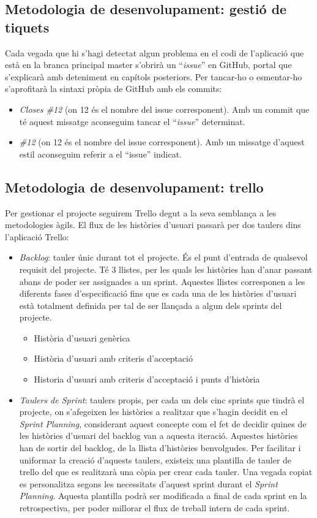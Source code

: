 \subsection{Metodologia de desenvolupament: gestió de tiquets}
Cada vegada que hi s'hagi detectat algun problema en el codi de l'aplicació que està en la branca principal master s'obrirà un “\textit{issue}” en GitHub, portal que s'explicarà amb deteniment en capítols posteriors. Per tancar-ho o esmentar-ho s'aprofitarà la sintaxi pròpia de GitHub amb els commits:
\begin{itemize}
\item \textit{Closes \#12} (on 12 és el nombre del issue corresponent). Amb un commit que té aquest missatge aconseguim tancar el “\textit{issue}” determinat.
\item \textit{\#12} (on 12 és el nombre del issue corresponent). Amb un missatge d'aquest estil aconseguim referir a el “issue” indicat.
\end{itemize}

\subsection{Metodologia de desenvolupament: trello}
Per gestionar el projecte seguirem Trello degut a la seva semblança a les metodologies àgils. El flux de les històries d'usuari passarà per dos taulers dins l'aplicació Trello:
\begin{itemize}
\item \textit{Backlog}: tauler únic durant tot el projecte. És el punt d'entrada de qualsevol requisit del projecte. Té 3 llistes, per les quals les històries han d'anar passant abans de poder ser assignades a un sprint. Aquestes llistes corresponen a les diferents fases d'especificació fins que es cada una de les històries d'usuari està totalment definida per tal de ser llançada a algun dels sprints del projecte.
\begin{itemize}
\item Història d'usuari genèrica
\item Història d'usuari amb criteris d'acceptació
\item Historia d'usuari amb criteris d'acceptació i punts d'història
\end{itemize}
\item \textit{Taulers de Sprint}: taulers propis, per cada un dels cinc sprints que tindrà el projecte, on s'afegeixen les històries a realitzar que s'hagin decidit en el \textit{Sprint Planning}, considerant aquest concepte com el fet de decidir quines de les històries d'usuari del backlog van a aquesta iteració. Aquestes històries han de sortir del backlog, de la llista d'històries benvolgudes. Per facilitar i uniformar la creació d'aquests taulers, existeix una plantilla de tauler de trello del que es realitzarà una còpia per crear cada tauler. Una vegada copiat es personalitza segons les necessitats d'aquest sprint durant el \textit{Sprint Planning}. Aquesta plantilla podrà ser modificada a final de cada sprint en la retrospectiva, per poder millorar el flux de treball intern de cada sprint.
\end{itemize}

